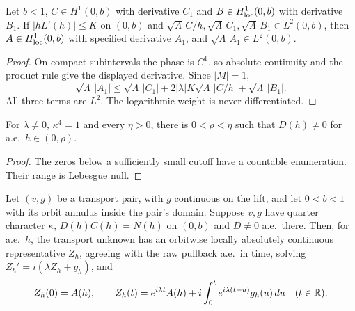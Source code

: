 \begin{lemma}
\label{lem:log-midpoint-gain}
\leanok
Let $b<1$, $C\in H^1(0,b)$ with derivative $C_1$ and
$B\in H^1_{\rm loc}(0,b)$ with derivative $B_1$.
If $|hL'(h)|\le K$ on $(0,b)$ and
$\sqrt\Lambda\,C/h,\sqrt\Lambda\,C_1,\sqrt\Lambda\,B_1\in L^2(0,b)$,
then $A\in H^1_{\rm loc}(0,b)$ with specified derivative $A_1$, and
$\sqrt\Lambda\,A_1\in L^2(0,b)$.
\end{lemma}

\begin{proof}
\leanok
On compact subintervals the phase is $C^1$, so absolute continuity and
the product rule give the displayed derivative.
Since $|M|=1$,
\[
 \sqrt\Lambda\,|A_1|
 \le \sqrt\Lambda\,|C_1|+
       2|\lambda|K\sqrt\Lambda\,|C/h|+
       \sqrt\Lambda\,|B_1|.
\]
All three terms are $L^2$. The logarithmic weight is never differentiated.
\end{proof}

\begin{lemma}
\label{lem:quarter-divisor-ae}
\leanok
For $\lambda\ne0$, $\kappa^4=1$ and every $\eta>0$, there is
$0<\rho<\eta$ such that $D(h)\ne0$ for a.e.\ $h\in(0,\rho)$.
\end{lemma}

\begin{proof}
\leanok
The zeros below a sufficiently small cutoff have a countable enumeration.
Their range is Lebesgue null.
\end{proof}

\begin{lemma}
\label{lem:quarter-midpoint-reconstruction}
\leanok
Let $(v,g)$ be a transport pair, with $g$ continuous on the lift, and let
$0<b<1$ with its orbit annulus inside the pair's domain.
Suppose $v,g$ have quarter character $\kappa$, $D(h)C(h)=N(h)$ on
$(0,b)$ and $D\ne0$ a.e.\ there.
Then, for a.e.\ $h$, the transport unknown has an orbitwise locally
absolutely continuous representative $Z_h$, agreeing with the raw
pullback a.e.\ in time, solving $Z_h'=i(\lambda Z_h+g_h)$, and
\[
 Z_h(0)=A(h),\qquad
 Z_h(t)=e^{i\lambda t}A(h)+
     i\int_0^t e^{i\lambda(t-u)}g_h(u)\,du\quad(t\in\mathbb{R}).
\]
\end{lemma}

